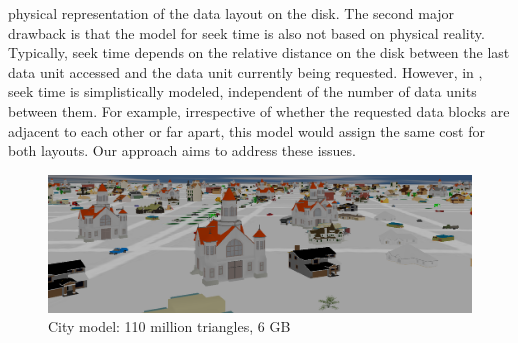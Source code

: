 physical representation of the data layout on the disk. The second major
drawback is that the model for seek time is also not based on physical reality.
Typically, seek time depends on the relative distance on the disk between the
last data unit accessed and the data unit currently being requested. However,
in \cite{optimizingredundancy}, seek time is simplistically modeled,
independent of the number of data units between them. For example,
irrespective of whether the requested data blocks are adjacent to
each other or far apart, this model would assign the same cost for both
layouts. Our approach
aims to address these issues. 


\begin{figure}[t]
  \centering
  \includegraphics[width=\columnwidth]{city.png}
  \caption{City model: 110 million triangles, 6 GB }
  \label{fig:model1}
\end{figure}


